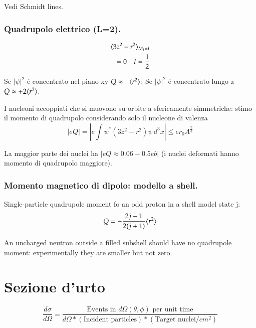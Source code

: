 \documentclass[main.tex]{subfiles}
\begin{document}
Vedi Schmidt lines.

\subsection{Quadrupolo elettrico (L=2).}

\begin{align*}
\langle 3z^2-r^2 \rangle_{M_I=I}\\
=0 \quad I=\frac{1}{2}
\end{align*}

Se $|\psi|^2$ \'e concentrato nel piano xy $Q\approx-\langle r^2 \rangle$; Se $|\psi|^2$ \'e concentrato lungo z $Q\approx+2\langle r^2 \rangle$.

I nucleoni accoppiati che si muovono su orbite a sfericamente simmetriche: stimo il momento di quadrupolo considerando solo il nucleone di valenza 
\begin{equation*}
|eQ|=|e\int\psi^*(3z^2-r^2)\psi\,d^3x|\leq er_0A^{\frac{2}{3}}
\end{equation*}

La maggior parte dei nuclei ha $|eQ\approx0.06-0.5eb|$ (i nuclei deformati hanno momento di quadrupolo maggiore).

\subsection{Momento magnetico di dipolo: modello a shell.}

\begin{itemize*}

\item Single-particle quadrupole moment fo an odd proton in a shell model state j:
\begin{equation*}
Q=-\frac{2j-1}{2(j+1)}\langle r^2 \rangle
\end{equation*}

\item An uncharged neutron outside a filled subshell should have no quadrupole moment: experimentally they are smaller but not zero.

\end{itemize*}

\chapter{Sezione d'urto}
 
 
 \begin{equation*}
 \frac{d\sigma}{d\Omega}=\frac{\text{Events in $d\Omega(\theta,\phi)$ per unit time}}{d\Omega*(\text{Incident particles})*(\text{Target nuclei}/cm^2)}
 \end{equation*}
 
\end{document}
